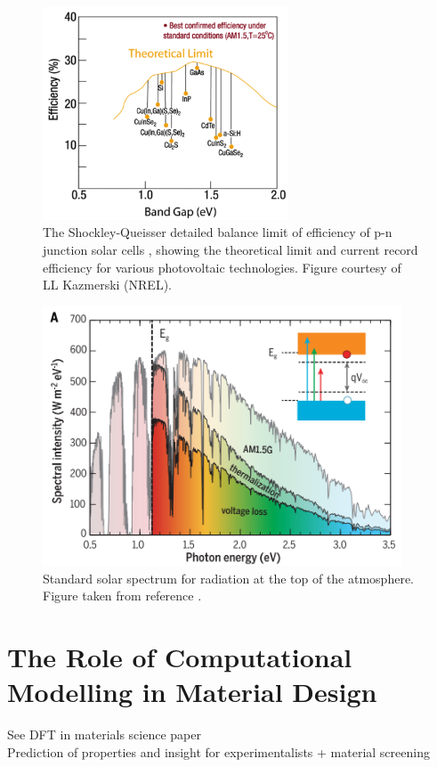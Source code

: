 \begin{figure}[h!]
  \centering
    \includegraphics[width=0.65\textwidth]{figures/SQ.png}
    \caption{The Shockley-Queisser detailed balance limit of efficiency of p-n junction solar cells \cite{SQ_1961}, showing the theoretical limit and current record efficiency for various photovoltaic technologies. Figure courtesy of LL Kazmerski (NREL).}
  \label{SQ}
\end{figure}

\begin{figure}[h!]
  \centering
    \includegraphics[width=0.95\textwidth]{figures/solar_spectrum2.png}
    \caption{Standard solar spectrum for radiation at the top of the atmosphere. Figure taken from reference .}
  \label{solar_spectrum}
\end{figure}



\section{The Role of Computational Modelling in Material Design}
See DFT in materials science paper\\
Prediction of properties and insight for experimentalists + material screening\\

